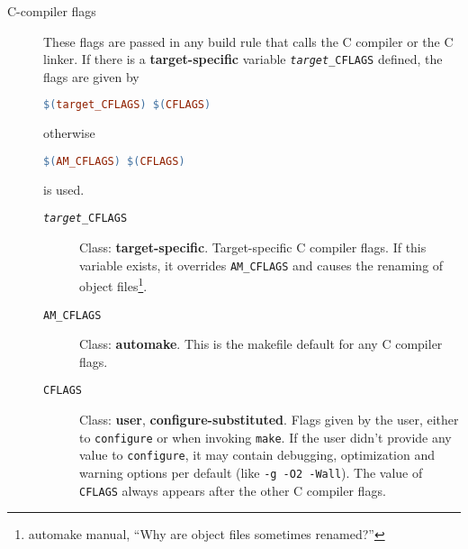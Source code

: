 \documentclass[11pt,a4paper,headinclude,footinclude,DIV16,normalheadings]{scrartcl}
\begin{document}
\begin{description}
\item[C-compiler flags] These flags are passed in any build rule that calls
  the C compiler or the C linker.  If there is a {\bf target-specific}
  variable \texttt{\textit{target}\_CFLAGS} defined, the flags are given by
\begin{lstlisting}[language=make]
$(target_CFLAGS) $(CFLAGS)
\end{lstlisting}
  otherwise
\begin{lstlisting}[language=make]
$(AM_CFLAGS) $(CFLAGS)
\end{lstlisting}
  is used.
  \begin{description}
  \item[\texttt{\textit{target}\_CFLAGS}] Class: {\bf target-specific}.
    Target-specific C compiler flags.  If this variable exists, it overrides
    \texttt{AM\_CFLAGS} and causes the renaming of object
    files\footnote{automake manual, ``Why are object files sometimes
      renamed?''}.
  \item[\texttt{AM\_CFLAGS}] Class: {\bf automake}.  This is the makefile
    default for any C compiler flags.
  \item[\texttt{CFLAGS}] Class: {\bf user}, {\bf configure-substituted}.
    Flags given by the user, either to \texttt{configure} or when invoking
    \texttt{make}.  If the user didn't provide any value to
    \texttt{configure}, it may contain debugging, optimization and warning
    options per default (like \texttt{-g -O2 -Wall}).  The value of
    \texttt{CFLAGS} always appears after the other C compiler flags.
  \end{description}


\end{description}
\end{document}
